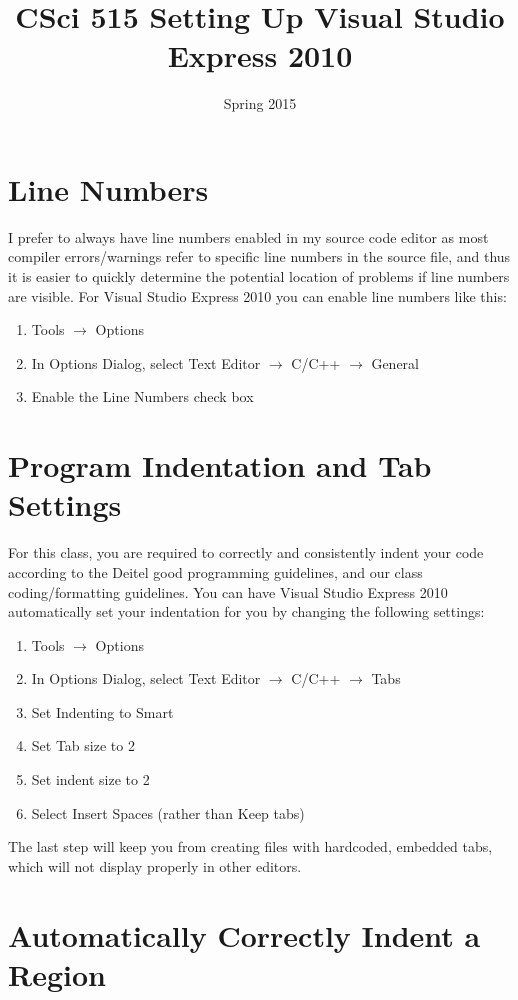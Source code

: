 \documentclass[11pt]{article}
\title{CSci 515 Setting Up Visual Studio Express 2010}
\author{}
\date{Spring 2015}
\begin{document}
\maketitle


\section{Line Numbers}
\label{sec-1}


I prefer to always have line numbers enabled in my source code editor
as most compiler errors/warnings refer to specific line numbers in the
source file, and thus it is easier to quickly determine the potential
location of problems if line numbers are visible.  For Visual Studio
Express 2010 you can enable line numbers like this:

\begin{enumerate}
\item Tools $\rightarrow$ Options
\item In Options Dialog, select Text Editor $\rightarrow$ C/C++ $\rightarrow$ General
\item Enable the Line Numbers check box
\end{enumerate}
\section{Program Indentation and Tab Settings}
\label{sec-2}

For this class, you are required to correctly and consistently indent
your code according to the Deitel good programming guidelines, and our
class coding/formatting guidelines.  You can have Visual Studio
Express 2010 automatically set your indentation for you by changing
the following settings:

\begin{enumerate}
\item Tools $\rightarrow$ Options
\item In Options Dialog, select Text Editor $\rightarrow$ C/C++ $\rightarrow$ Tabs
\item Set Indenting to Smart
\item Set Tab size to 2
\item Set indent size to 2
\item Select Insert Spaces (rather than Keep tabs)
\end{enumerate}

The last step will keep you from creating files with hardcoded,
embedded tabs, which will not display properly in other editors.
\section{Automatically Correctly Indent a Region}
\label{sec-3}
\end{document}
